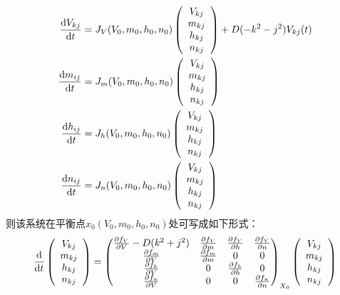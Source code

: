 \documentclass[
pdflinks,
]{xjtuthesis}
\begin{document}
\begin{align}
\notag \frac{\mathrm d V_{kj}}{\mathrm d t} &= J_{V}(V_0,m_0,h_0,n_0)
\left(
\begin{array}{c}
V_{kj}\\
m_{kj}\\
h_{kj}\\
n_{kj}
\end{array}
\right)+D(-k^2-j^2)V_{kj}(t)\\
\frac{\mathrm d m_{ij}}{\mathrm d t} &= J_{m}(V_0,m_0,h_0,n_0)
\left(
\begin{array}{c}
V_{kj}\\
m_{kj}\\
h_{kj}\\
n_{kj}
\end{array}
\right) \\
\notag \frac{\mathrm d h_{ij}}{\mathrm d t} &= J_{h}(V_0,m_0,h_0,n_0)
\left(
\begin{array}{c}
V_{kj}\\
m_{kj}\\
h_{kj}\\
n_{kj}
\end{array}
\right)\\
\notag \frac{\mathrm d n_{ij}}{\mathrm d t} &= J_{n}(V_0,m_0,h_0,n_0)
\left(
\begin{array}{c}
V_{kj}\\
m_{kj}\\
h_{kj}\\
n_{kj}
\end{array}
\right) 
\end{align}
则该系统在平衡点$x_0(V_{0},m_{0},h_{0},n_{0})$处可写成如下形式：
\begin{align}
\frac{\mathrm d }{\mathrm d t} \left(\begin{array}{c}
V_{kj}\\
m_{kj}\\
h_{kj}\\
n_{kj}
\end{array}
\right)
=\left(
\begin{matrix} 
\frac{\partial f_V}{\partial V} - D(k^2+j^2) & \frac{\partial f_V}{\partial m} & \frac{\partial f_V}{\partial h} & \frac{\partial f_V}{\partial n}\\ 
\frac{\partial f_m}{\partial V} & \frac{\partial f_m}{\partial m} & 0 & 0\\ 
\frac{\partial f_h}{\partial V} & 0 & \frac{\partial f_h}{\partial h} & 0 \\
\frac{\partial f_n}{\partial V} & 0 & 0 & \frac{\partial f_n}{\partial n}
\end{matrix}
\right)_{X_0}
\left(
\begin{array}{c}
V_{kj}\\
m_{kj}\\
h_{kj}\\
n_{kj}
\end{array}
\right) 
\end{align}
\end{document}

